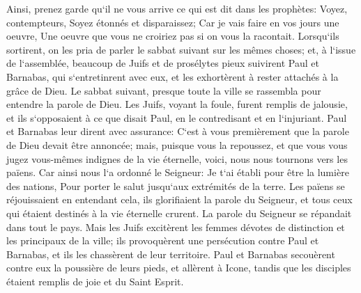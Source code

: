 \verse Ainsi, prenez garde qu`il ne vous arrive ce qui est dit dans les prophètes: 
\verse Voyez, contempteurs, Soyez étonnés et disparaissez; Car je vais faire en vos jours une oeuvre, Une oeuvre que vous ne croiriez pas si on vous la racontait. 
\verse Lorsqu`ils sortirent, on les pria de parler le sabbat suivant sur les mêmes choses; 
\verse et, à l`issue de l`assemblée, beaucoup de Juifs et de prosélytes pieux suivirent Paul et Barnabas, qui s`entretinrent avec eux, et les exhortèrent à rester attachés à la grâce de Dieu. 
\verse Le sabbat suivant, presque toute la ville se rassembla pour entendre la parole de Dieu. 
\verse Les Juifs, voyant la foule, furent remplis de jalousie, et ils s`opposaient à ce que disait Paul, en le contredisant et en l`injuriant. 
\verse Paul et Barnabas leur dirent avec assurance: C`est à vous premièrement que la parole de Dieu devait être annoncée; mais, puisque vous la repoussez, et que vous vous jugez vous-mêmes indignes de la vie éternelle, voici, nous nous tournons vers les païens. 
\verse Car ainsi nous l`a ordonné le Seigneur: Je t`ai établi pour être la lumière des nations, Pour porter le salut jusqu`aux extrémités de la terre. 
\verse Les païens se réjouissaient en entendant cela, ils glorifiaient la parole du Seigneur, et tous ceux qui étaient destinés à la vie éternelle crurent. 
\verse La parole du Seigneur se répandait dans tout le pays. 
\verse Mais les Juifs excitèrent les femmes dévotes de distinction et les principaux de la ville; ils provoquèrent une persécution contre Paul et Barnabas, et ils les chassèrent de leur territoire. 
\verse Paul et Barnabas secouèrent contre eux la poussière de leurs pieds, et allèrent à Icone, 
\verse tandis que les disciples étaient remplis de joie et du Saint Esprit. 

\chapter{}

